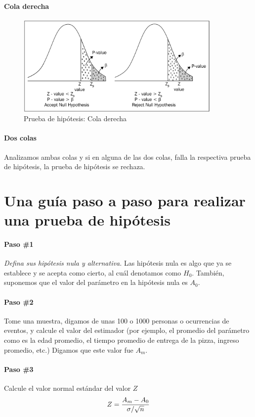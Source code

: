 \paragraph{Cola derecha}
\begin{figure}
 \centering
 \includegraphics[width=10cm,keepaspectratio=true]{./images/kum0404.png}
 \caption{Prueba de hipótesis: Cola derecha}
 \label{kum0403}
\end{figure}


\paragraph{Dos colas}
Analizamos ambas colas y si en alguna de las dos colas, falla la respectiva prueba de hipótesis, la prueba de hipótesis se rechaza.


\section{Una guía paso a paso para realizar una prueba de hipótesis}
\paragraph{Paso \#1}
\emph{Defina sus hipótesis nula y alternativa.} Las hipótesis nula es algo que ya se establece y se acepta como cierto, al cuál denotamos como $H_{0}.$ También, suponemos que el valor del parámetro en la hipótesis nula es $A_{0}.$

\paragraph{Paso \#2}
Tome una muestra, digamos de unas 100 o 1000 personas o ocurrencias de eventos, y calcule el valor del estimador (por ejemplo, el promedio del parámetro como es la edad promedio, el tiempo promedio de entrega de la pizza, ingreso promedio, etc.) Digamos que este valor fue $A_{m}.$

\paragraph{Paso \#3}
Calcule el valor normal estándar del valor $Z$
\begin{align}
 Z=\dfrac{A_{m}-A_{0}}{\sigma/\sqrt{n}}
\end{align}



